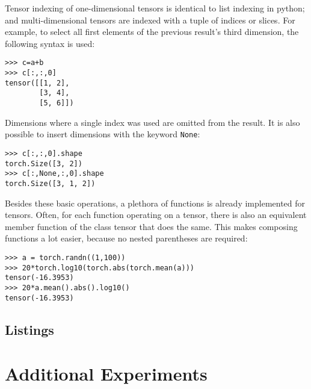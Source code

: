 Tensor indexing of one-dimensional tensors is identical to list indexing in python;
and multi-dimensional tensors are indexed with a tuple of indices or slices.
For example, to select all first elements of the previous result's third dimension, the following syntax is used:
\begin{lstlisting}
>>> c=a+b
>>> c[:,:,0]
tensor([[1, 2],
        [3, 4],
        [5, 6]])
\end{lstlisting}
Dimensions where a single index was used are omitted from the result.
It is also possible to insert dimensions with the keyword \verb|None|:
\begin{lstlisting}
>>> c[:,:,0].shape
torch.Size([3, 2])
>>> c[:,None,:,0].shape
torch.Size([3, 1, 2])
\end{lstlisting}

Besides these basic operations, a plethora of functions is already implemented for tensors.
Often, for each function operating on a tensor,
there is also an equivalent member function of the class tensor that does the same.
This makes composing functions a lot easier, because no nested parentheses are required:
\begin{lstlisting}
>>> a = torch.randn((1,100))
>>> 20*torch.log10(torch.abs(torch.mean(a)))
tensor(-16.3953)
>>> 20*a.mean().abs().log10()
tensor(-16.3953)
\end{lstlisting}

\newpage
\section{Listings}







\chapter{Additional Experiments}